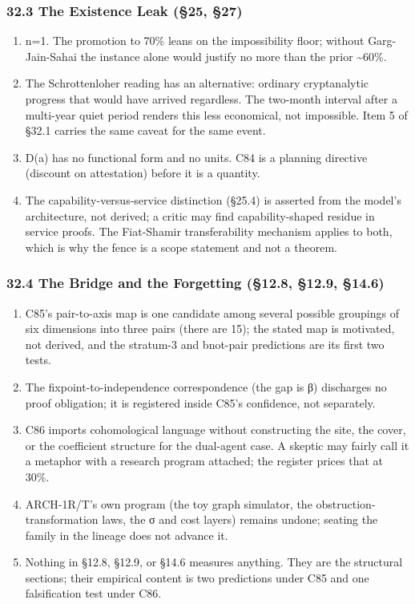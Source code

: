 \documentclass[
]{article}
\providecommand{\tightlist}{%
  \setlength{\itemsep}{0pt}\setlength{\parskip}{0pt}}
\begin{document}
\subsubsection{32.3 The Existence Leak (§25,
§27)}\label{the-existence-leak-25-27}

\begin{enumerate}
\def\labelenumi{\arabic{enumi}.}
\tightlist
\item
  n=1. The promotion to 70\% leans on the impossibility floor; without
  Garg-Jain-Sahai the instance alone would justify no more than the
  prior \textasciitilde60\%.
\item
  The Schrottenloher reading has an alternative: ordinary cryptanalytic
  progress that would have arrived regardless. The two-month interval
  after a multi-year quiet period renders this less economical, not
  impossible. Item 5 of §32.1 carries the same caveat for the same
  event.
\item
  D(a) has no functional form and no units. C84 is a planning directive
  (discount on attestation) before it is a quantity.
\item
  The capability-versus-service distinction (§25.4) is asserted from the
  model's architecture, not derived; a critic may find capability-shaped
  residue in service proofs. The Fiat-Shamir transferability mechanism
  applies to both, which is why the fence is a scope statement and not a
  theorem.
\end{enumerate}

\subsubsection{32.4 The Bridge and the Forgetting (§12.8, §12.9,
§14.6)}\label{the-bridge-and-the-forgetting-12.8-12.9-14.6}

\begin{enumerate}
\def\labelenumi{\arabic{enumi}.}
\tightlist
\item
  C85's pair-to-axis map is one candidate among several possible
  groupings of six dimensions into three pairs (there are 15); the
  stated map is motivated, not derived, and the stratum-3 and bnot-pair
  predictions are its first two tests.
\item
  The fixpoint-to-independence correspondence (the gap is β) discharges
  no proof obligation; it is registered inside C85's confidence, not
  separately.
\item
  C86 imports cohomological language without constructing the site, the
  cover, or the coefficient structure for the dual-agent case. A skeptic
  may fairly call it a metaphor with a research program attached; the
  register prices that at 30\%.
\item
  ARCH-1R/T's own program (the toy graph simulator, the
  obstruction-transformation laws, the σ and cost layers) remains
  undone; seating the family in the lineage does not advance it.
\item
  Nothing in §12.8, §12.9, or §14.6 measures anything. They are the
  structural sections; their empirical content is two predictions under
  C85 and one falsification test under C86.
\end{enumerate}
\end{document}
